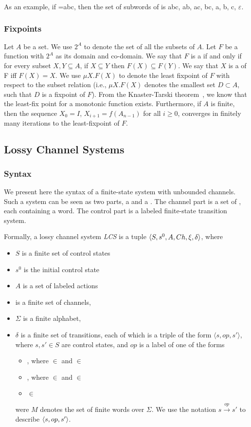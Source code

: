As an example, if =abc, then the set of subwords of  is {abc, ab, ac, bc, a, b, c, $\varepsilon$}.

\subsubsection{Fixpoints}
Let $A$ be a set. We use $2^A$ to denote the set of all the subsets of $A$. Let $F$ be a function with $2^A$ as its domain and co-domain. We say that $F$ is a  if and only if for every subset $X,Y \subseteq A$, if $X \subseteq Y$ then $F(X) \subseteq F(Y)$.  We say that $X$ is a  of F iff $F(X)=X$. We use $\mu X. F(X)$ to denote the least fixpoint of $F$ with respect to the subset relation (i.e.,  $\mu X. F(X)$ denotes the smallest set $D \subset A$, such that $D$ is a fixpoint of $F$). From the Knaster-Tarski theorem~\cite{tarski}, we know that the least-fix point for a monotonic function exists. Furthermore, if $A$ is finite, then the sequence $X_0 = I$, $X_{i+1} = f(A_{n-1})$ for all $i \geq 0$, converges in finitely many iterations to the least-fixpoint of $F$.

\subsection{Lossy Channel Systems}
\label{CS}
\subsubsection{Syntax}
We present here the syntax of a finite-state system with unbounded channels. Such a system can be seen as two parts, a  and a . The channel part is a set of , each containing a word. The control part is a labeled finite-state transition system.

Formally, a lossy channel system \emph{LCS} is a tuple $\langle S,s^0, A, Ch,\xi, \delta\rangle$, where
\begin{itemize}
  \item $S$ is a finite set of control states
  \item $s^0$ is the initial control state
  \item $A$ is a set of labeled actions
  \item {} is a finite set of channels,
  \item $\Sigma$ is a finite alphabet,
  \item $\delta$ is a finite set of transitions, each of which is a triple of the form $\langle s,op,s'\rangle$, where $s, s'\in S$ are control states, and $op$ is a label of one of the forms
    \begin{itemize}
      \item {}, where  $\in$  and  $\in$ 
      \item {}, where  $\in$  and  $\in$ 
      \item {} $\in$ 
    \end{itemize}
    were $M$ denotes the set of finite words over $\Sigma$. We use the notation $s \xrightarrow{op} s'$ to describe $\langle s, op, s'\rangle$.
\end{itemize}

